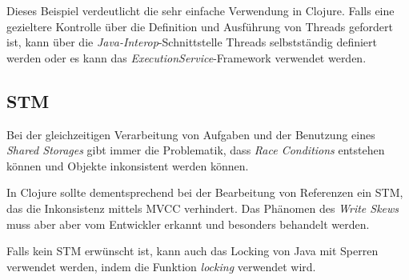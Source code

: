 Dieses Beispiel verdeutlicht die sehr einfache Verwendung in Clojure. Falls eine gezieltere Kontrolle über die Definition und Ausführung von Threads gefordert ist, kann über die \textit{Java-Interop}-Schnittstelle Threads selbstständig definiert werden oder es kann das \textit{ExecutionService}-Framework verwendet werden.

\subsection*{\acl{STM}}
Bei der gleichzeitigen Verarbeitung von Aufgaben und der Benutzung eines \textit{Shared Storages} gibt immer die Problematik, dass \textit{Race Conditions} entstehen können und Objekte inkonsistent werden können.

In Clojure sollte dementsprechend bei der Bearbeitung von Referenzen ein \acf{STM}, das die Inkonsistenz mittels \ac{MVCC} verhindert. Das Phänomen des \textit{Write Skews} muss aber aber vom Entwickler erkannt und besonders behandelt werden.

Falls kein \ac{STM} erwünscht ist, kann auch das Locking von Java mit Sperren verwendet werden, indem die Funktion \textit{locking} verwendet wird.
